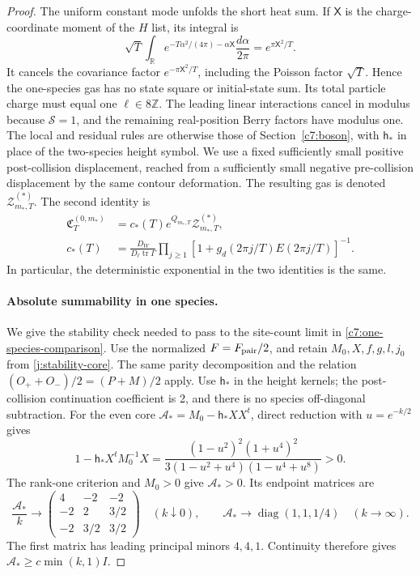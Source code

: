 \begin{proof}
The uniform constant mode unfolds the short heat sum. If $\mathsf X$ is the
charge-coordinate moment of the $H$ list, its integral is
\[
 \sqrt T\int_{\mathbb R}
 e^{-T\alpha^2/(4\pi)-\alpha\mathsf X}\frac{d\alpha}{2\pi}
 =e^{\pi\mathsf X^2/T}.
\]
It cancels the covariance factor $e^{-\pi\mathsf X^2/T}$, including the
Poisson factor $\sqrt T$. Hence the one-species gas has no state square
or initial-state sum. Its total particle charge must equal one
$\ell\in8\mathbb Z$. The leading linear interactions cancel in
modulus because $\mathcal S=1$, and the remaining real-position Berry
factors have modulus one. The local and residual rules are otherwise
those of Section~\ref{c7:boson}, with $\mathsf h_*$ in place of the
two-species height symbol. We use a fixed sufficiently small positive
post-collision displacement, reached from a sufficiently small negative
pre-collision displacement by the same contour deformation. The
resulting gas is denoted $\mathcal Z^{(*)}_{m_*,T}$. The second identity is
\begin{equation}\label{c7:one-species-comparison}
\begin{aligned}
 \mathfrak C^{(0,m_*)}_T
 &=c_*(T)e^{Q_{m_*,T}}\mathcal Z^{(*)}_{m_*,T},\\
 c_*(T)&=\frac{D_W}{D_\ell\operatorname{tr}\Gamma}
 \prod_{j\ge1}[1+g_d(2\pi j/T)E(2\pi j/T)]^{-1}.
\end{aligned}
\end{equation}
In particular, the deterministic exponential in the two identities
is the same.

\paragraph{Absolute summability in one species.}
We give the stability check needed to pass to the site-count limit in
\eqref{c7:one-species-comparison}. Use the normalized
$F=F_{\rm pair}/2$, and retain $M_0,X,f,g,l,j_0$ from
\eqref{j:stability-core}. The same parity decomposition and the relation
$(O_++O_-)/2=(P+M)/2$ apply. Use $\mathsf h_*$ in the height kernels;
the post-collision continuation coefficient is 2, and there is no
species off-diagonal subtraction. For the even core
$\mathcal A_*=M_0-\mathsf h_*XX^t$, direct reduction with
$u=e^{-k/2}$ gives
\[
 1-\mathsf h_*X^tM_0^{-1}X
 =\frac{(1-u^2)^2(1+u^4)^2}
 {3(1-u^2+u^4)(1-u^4+u^8)}>0.
\]
The rank-one criterion and $M_0>0$ give $\mathcal A_*>0$. Its endpoint
matrices are
\[
 \frac{\mathcal A_*}{k}\longrightarrow
 \begin{pmatrix}4&-2&-2\\-2&2&3/2\\-2&3/2&3/2\end{pmatrix}
 \quad(k\downarrow0),\qquad
 \mathcal A_*\longrightarrow\operatorname{diag}(1,1,1/4)
 \quad(k\to\infty).
\]
The first matrix has leading principal minors $4,4,1$. Continuity
therefore gives $\mathcal A_*\ge c\min(k,1)I$.


\end{proof}
